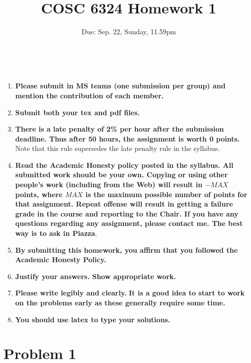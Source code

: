 \documentclass[11pt]{article}
\date{}
\begin{document}
\title{ COSC 6324 Homework 1}
\author{
Due: Sep. 22, Sunday, 11.59pm  \\
 }

 \maketitle

 \\

\begin{enumerate}
\item {\bf Please submit in MS teams (one submission per group)
and mention the contribution of each member.}

\item {\bf Submit both your tex and pdf files.}

\item {\bf There is a late penalty of 2\% per hour after the submission deadline. Thus after 50 hours, the assignment is worth 0 points.} Note that this rule supersedes the late penalty rule in the syllabus.

\item {\bf Read the Academic Honesty policy posted in the syllabus.
All submitted work should be  your own. Copying or using other people's work (including  from the Web) will result in $-MAX$ points, where $MAX$ is the maximum possible number of points for that assignment. Repeat offense will result in getting a failure grade in the course and reporting to the Chair. If you have any questions regarding any assignment, please contact me. The best way is to ask in Piazza}. 

\item {\bf By submitting this homework, you affirm that you followed the Academic Honesty Policy.}

\item {\bf  Justify your answers. Show appropriate work.} 

\item {\bf Please write legibly and clearly.} 
{\bf It is a good idea to start to work on the problems early as these generally require some time.} 

\item {\bf You should use latex to type your solutions.}
\end{enumerate}

\section*{Problem 1}
\end{document}
